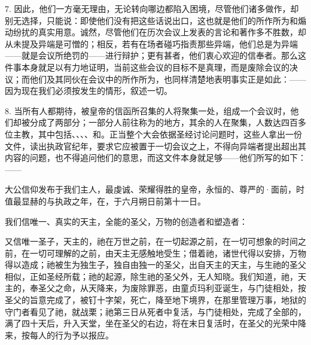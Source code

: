 7. 因此，他们一方毫无理由，无论转向哪边都陷入困境，尽管他们诸多做作，却别无选择，只能说：即使他们没有把这些话说出口，这也就是他们的所作所为和煽动纷扰的真实用意。诚然，尽管他们在历次会议上发表的言论和著作多不胜数，却从未提及异端是可憎的；相反，若有在场者碰巧指责那些异端，他们总是为异端——就是会议所绝罚的——进行辩护；更有甚者，他们衷心欢迎的信奉者。那么这件事本身就足以有力地证明，当前这些会议的目标不是真理，而是废除会议的决议；而他们及其同伙在会议中的所作所为，也同样清楚地表明事实正是如此：——因为现在我们必须按发生的情形，叙述一切。\par

8. 当所有人都期待，被皇帝的信函所召集的人将聚集一处，组成一个会议时，他们却被分成了两部分；一部分人前往称为的地方，其余的人在聚集，人数达四百多位主教，其中包括、、、、和。正当整个大会依据圣经讨论问题时，这些人拿出一份文件，读出执政官纪年，要求它应被置于一切会议之上，不得向异端者提出超出其内容的问题，也不得追问他们的意思，而这文件本身就足够——他们所写的如下：——\par

大公信仰发布于我们主人，最虔诚、荣耀得胜的皇帝，永恒的、尊严的·面前，时值最显赫的与执政之年，在，于六月朔日前第十一日。\par

我们信唯一、真实的天主，全能的圣父，万物的创造者和塑造者：\par

又信唯一圣子，天主的，祂在万世之前，在一切起源之前，在一切可想象的时间之前，在一切可理解的之前，由天主无感触地受生；借着祂，诸世代得以安排，万物得以造成；祂被生为独生子，独自由独一的圣父，出自天主的天主，与生祂的圣父相似，正如圣经所载；祂的起源，除生祂的圣父外，无人知晓。我们知道，祂，天主的，奉圣父之命，从天降来，为废除罪恶，由童贞玛利亚诞生，与门徒相处，按圣父的旨意完成了，被钉十字架，死亡，降至地下境界，在那里管理万事，地狱的守门者看见了祂，就战栗；祂第三日从死者中复活，与门徒相处，完成了全部的，满了四十天后，升入天堂，坐在圣父的右边，将在末日复活时，在圣父的光荣中降来，按每人的行为予以报应。\par


